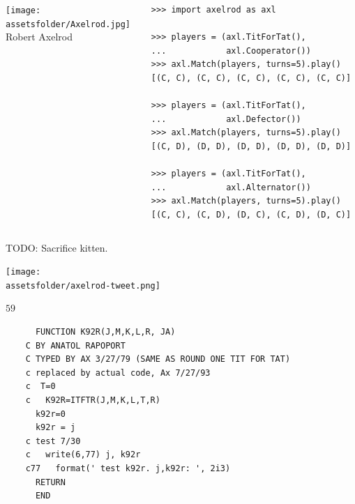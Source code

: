 \documentclass{beamer}
\newcommand{\assetsfolder}{./assets}
\begin{document}
	\begin{frame}[fragile]{}
		\begin{columns}
			\begin{column}{.4\textwidth}
				\begin{center}
					\texttt{[image: \\assetsfolder/Axelrod.jpg]}
					\\
					Robert Axelrod
				\end{center}
			\end{column}
			\pause
			\begin{column}{.6\textwidth}
				\begin{verbatim}
>>> import axelrod as axl

>>> players = (axl.TitForTat(),
...            axl.Cooperator())
>>> axl.Match(players, turns=5).play()
[(C, C), (C, C), (C, C), (C, C), (C, C)]

>>> players = (axl.TitForTat(),
...            axl.Defector())
>>> axl.Match(players, turns=5).play()
[(C, D), (D, D), (D, D), (D, D), (D, D)]

>>> players = (axl.TitForTat(),
...            axl.Alternator())
>>> axl.Match(players, turns=5).play()
[(C, C), (C, D), (D, C), (C, D), (D, C)]

				\end{verbatim}
			\end{column}
		\end{columns}
\end{frame}

	\begin{frame}
	\Huge
		\begin{center}
		TODO: Sacrifice kitten.
		\end{center}
	\end{frame}


    \begin{frame}
        \begin{center}
            \texttt{[image: \\assetsfolder/axelrod-tweet.png]}
        \end{center}
    \end{frame}

    \begin{frame}
        \begin{center}
            \fontsize{60}{70}\selectfont \(59\)
        \end{center}
    \end{frame}

\begin{frame}[fragile]{}
    \begin{verbatim}
      FUNCTION K92R(J,M,K,L,R, JA)
    C BY ANATOL RAPOPORT
    C TYPED BY AX 3/27/79 (SAME AS ROUND ONE TIT FOR TAT)
    c replaced by actual code, Ax 7/27/93
    c  T=0
    c   K92R=ITFTR(J,M,K,L,T,R)
      k92r=0
      k92r = j
    c test 7/30
    c   write(6,77) j, k92r
    c77   format(' test k92r. j,k92r: ', 2i3)
      RETURN
      END
        \end{verbatim}
\end{frame}
\end{document}
